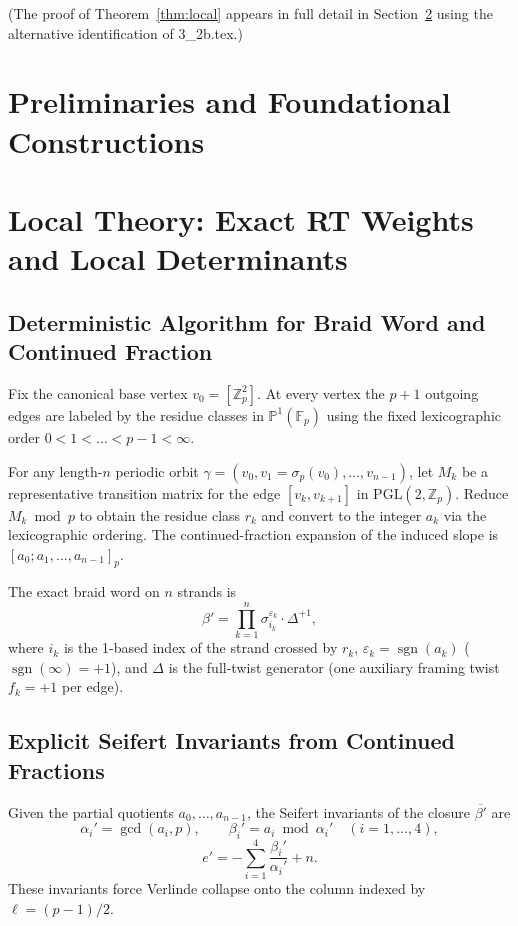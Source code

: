 \documentclass[11pt,a4paper]{amsart}
\begin{document}
(The proof of Theorem~\ref{thm:local} appears in full detail in Section~\ref{sec:local-theory} using the alternative identification of 3_2b.tex.)

\section{Preliminaries and Foundational Constructions}
\label{sec:prelim}


\section{Local Theory: Exact RT Weights and Local Determinants}
\label{sec:local-theory}

\subsection{Deterministic Algorithm for Braid Word and Continued Fraction}
\label{subsec:deterministic-algorithm}

Fix the canonical base vertex \(v_0 = [\mathbb{Z}_p^2]\). At every vertex the \(p+1\) outgoing edges are labeled by the residue classes in \(\mathbb{P}^1(\mathbb{F}_p)\) using the fixed lexicographic order \(0 < 1 < \dots < p-1 < \infty\).

For any length-\(n\) periodic orbit \(\gamma=(v_0,v_1=\sigma_p(v_0),\dots,v_{n-1})\), let \(M_k\) be a representative transition matrix for the edge \([v_k,v_{k+1}]\) in \(\mathrm{PGL}(2,\mathbb{Z}_p)\). Reduce \(M_k\bmod p\) to obtain the residue class \(r_k\) and convert to the integer \(a_k\) via the lexicographic ordering. The continued-fraction expansion of the induced slope is \([a_0;a_1,\dots,a_{n-1}]_p\).

The exact braid word on \(n\) strands is
\[
\beta'=\prod_{k=1}^n\sigma_{i_k}^{\varepsilon_k}\cdot\Delta^{+1},
\]
where \(i_k\) is the 1-based index of the strand crossed by \(r_k\), \(\varepsilon_k=\operatorname{sgn}(a_k)\) (\(\operatorname{sgn}(\infty)=+1\)), and \(\Delta\) is the full-twist generator (one auxiliary framing twist \(f_k=+1\) per edge).

\subsection{Explicit Seifert Invariants from Continued Fractions}
Given the partial quotients \(a_0,\dots,a_{n-1}\), the Seifert invariants of the closure \(\overline{\beta'}\) are
\[
\alpha_i'=\gcd(a_i,p),\qquad\beta_i'=a_i\bmod\alpha_i'\quad(i=1,\dots,4),
\]
\[
e'=-\sum_{i=1}^4\frac{\beta_i'}{\alpha_i'}+n.
\]
These invariants force Verlinde collapse onto the column indexed by \(\ell=(p-1)/2\).
\end{document}
